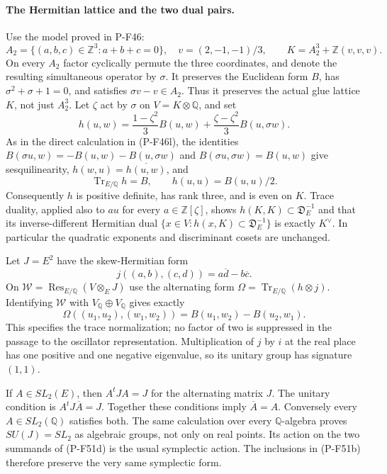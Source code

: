 \documentclass[11pt,a4paper]{article}
\begin{document}
\paragraph{The Hermitian lattice and the two dual pairs.}
Use the model proved in P-F46:
\[
 A_2=\{(a,b,c)\in\mathbb Z^3:a+b+c=0\},\quad
 v=(2,-1,-1)/3,\qquad
 K=A_2^3+\mathbb Z(v,v,v).
\]
On every $A_2$ factor cyclically permute the three
coordinates, and denote the resulting simultaneous
operator by $\sigma$. It preserves the Euclidean form
$B$, has $\sigma^2+\sigma+1=0$, and satisfies
$\sigma v-v\in A_2$. Thus it preserves the actual glue
lattice $K$, not just $A_2^3$. Let $\zeta$ act by
$\sigma$ on $V=K\otimes\mathbb Q$, and set
\[
 h(u,w)=\frac{1-\zeta^2}{3}B(u,w)
       +\frac{\zeta-\zeta^2}{3}B(u,\sigma w).
 \tag{P-F51c}
\]
As in the direct calculation in (P-F46l), the identities
$B(\sigma u,w)=-B(u,w)-B(u,\sigma w)$ and
$B(\sigma u,\sigma w)=B(u,w)$ give sesquilinearity,
$h(w,u)=\overline{h(u,w)}$, and
\[
       \operatorname{Tr}_{E/\mathbb Q}h=B,
       \qquad h(u,u)=B(u,u)/2.
\]
Consequently $h$ is positive definite, has rank three,
and is even on $K$. Trace duality, applied also to
$au$ for every $a\in\mathbb Z[\zeta]$, shows
$h(K,K)\subset\mathfrak D_E^{-1}$ and that its
inverse-different Hermitian dual
$\{x\in V:h(x,K)\subset\mathfrak D_E^{-1}\}$ is exactly
$K^\vee$. In particular the
quadratic exponents and discriminant cosets are unchanged.

Let $J=E^2$ have the skew-Hermitian form
\[
 j((a,b),(c,d))=a\overline d-b\overline c.
\]
On $\mathcal W=\operatorname{Res}_{E/\mathbb Q}(V\otimes_EJ)$
use the alternating form
$\Omega=\operatorname{Tr}_{E/\mathbb Q}(h\otimes j)$.
Identifying $\mathcal W$ with $V_{\mathbb Q}\oplus V_{\mathbb Q}$
gives exactly
\[
 \Omega((u_1,u_2),(w_1,w_2))
            =B(u_1,w_2)-B(u_2,w_1).
 \tag{P-F51d}
\]
This specifies the trace normalization; no factor of two
is suppressed in the passage to the oscillator representation.
Multiplication of $j$ by $i$ at the real place has one
positive and one negative eigenvalue, so its unitary
group has signature $(1,1)$.

If $A\in SL_2(E)$, then $A^tJA=J$ for the alternating
matrix $J$. The unitary condition is $A^tJ\overline A=J$.
Together these conditions imply $\overline A=A$.
Conversely every $A\in SL_2(\mathbb Q)$ satisfies both.
The same calculation over every $\mathbb Q$-algebra
proves $SU(J)=SL_2$ as algebraic groups, not only on
real points. Its action on the two summands of (P-F51d)
is the usual symplectic action. The inclusions in
(P-F51b) therefore preserve the very same symplectic form.
\end{document}

